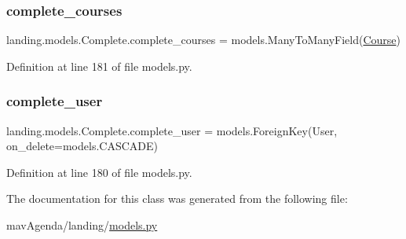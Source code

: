 \subsubsection{\texorpdfstring{complete\+\_\+courses}{complete\_courses}}
{\footnotesize\ttfamily landing.\+models.\+Complete.\+complete\+\_\+courses = models.\+Many\+To\+Many\+Field(\mbox{\hyperlink{classlanding_1_1models_1_1Course}{Course}})\hspace{0.3cm}{\ttfamily [static]}}



Definition at line 181 of file models.\+py.

\mbox{\label{classlanding_1_1models_1_1Complete_a991355f0331ce0c2567ee5dd75c24897}} 
\subsubsection{\texorpdfstring{complete\+\_\+user}{complete\_user}}
{\footnotesize\ttfamily landing.\+models.\+Complete.\+complete\+\_\+user = models.\+Foreign\+Key(User, on\+\_\+delete=models.\+C\+A\+S\+C\+A\+DE)\hspace{0.3cm}{\ttfamily [static]}}



Definition at line 180 of file models.\+py.



The documentation for this class was generated from the following file\+:\begin{DoxyCompactItemize}
\item 
mav\+Agenda/landing/\mbox{\hyperlink{models_8py}{models.\+py}}\end{DoxyCompactItemize}

